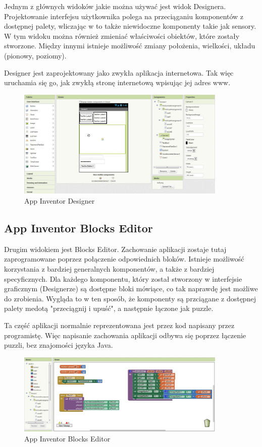 Jednym z głównych widoków jakie można używać jest widok Designera. Projektowanie interfejsu użytkownika polega na przeciąganiu komponentów z dostępnej palety, wliczając w to także niewidoczne komponenty takie jak sensory. W tym widoku można również zmieniać właściwości obiektów, które zostały stworzone. Między innymi istnieje możliwość zmiany położenia, wielkości, układu (pionowy, poziomy).

Designer jest zaprojektowany jako zwykła aplikacja internetowa. Tak więc uruchamia się go, jak zwykłą stronę internetową wpisując jej adres www.

\begin{figure}[th] 
\centering\includegraphics[width=10cm]{figures/designer}
\caption{App Inventor Designer}
\end{figure}

\subsection{App Inventor Blocks Editor}
\label{c222}

Drugim widokiem jest Blocks Editor. Zachowanie aplikacji zostaje tutaj zaprogramowane poprzez połączenie odpowiednich bloków. Istnieje możliwość korzystania z bardziej generalnych komponentów, a także z bardziej specyficznych. Dla każdego komponentu, który został stworzony w interfejsie graficznym (Designerze) są dostępne bloki mówiące, co tak naprawdę jest możliwe do zrobienia. Wygląda to w ten sposób, że komponenty są przciągane z dostępnej palety medotą "przeciągnij i upuść", a następnie łączone jak puzzle.

Ta część aplikacji normalnie reprezentowana jest przez kod napisany przez programistę. Więc napisanie zachowania aplikacji odbywa się poprzez łączenie puzzli, bez znajomości języka Java.

\begin{figure}[th] 
\centering\includegraphics[width=10cm]{figures/editor}
\caption{App Inventor Blocks Editor}
\end{figure}

